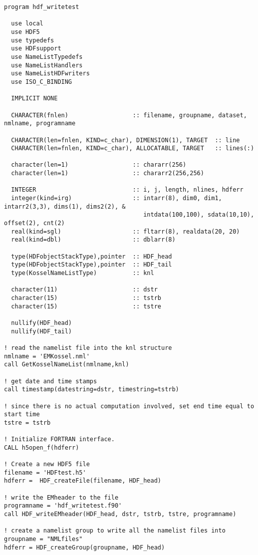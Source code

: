 \documentclass[DIV=calc, paper=letter, fontsize=11pt]{scrartcl}	 %
\begin{document}
{\small\begin{verbatim}
program hdf_writetest

  use local
  use HDF5
  use typedefs
  use HDFsupport
  use NameListTypedefs
  use NameListHandlers
  use NameListHDFwriters
  use ISO_C_BINDING
  
  IMPLICIT NONE

  CHARACTER(fnlen)                  :: filename, groupname, dataset, nmlname, programname
  
  CHARACTER(len=fnlen, KIND=c_char), DIMENSION(1), TARGET  :: line 
  CHARACTER(len=fnlen, KIND=c_char), ALLOCATABLE, TARGET   :: lines(:) 

  character(len=1)                  :: chararr(256)
  character(len=1)                  :: chararr2(256,256)

  INTEGER                           :: i, j, length, nlines, hdferr
  integer(kind=irg)                 :: intarr(8), dim0, dim1, intarr2(3,3), dims(1), dims2(2), &
                                       intdata(100,100), sdata(10,10), offset(2), cnt(2)
  real(kind=sgl)                    :: fltarr(8), realdata(20, 20)
  real(kind=dbl)                    :: dblarr(8)

  type(HDFobjectStackType),pointer  :: HDF_head
  type(HDFobjectStackType),pointer  :: HDF_tail
  type(KosselNameListType)          :: knl

  character(11)                     :: dstr
  character(15)                     :: tstrb
  character(15)                     :: tstre

  nullify(HDF_head)
  nullify(HDF_tail)

! read the namelist file into the knl structure
nmlname = 'EMKossel.nml'
call GetKosselNameList(nmlname,knl)

! get date and time stamps
call timestamp(datestring=dstr, timestring=tstrb)

! since there is no actual computation involved, set end time equal to start time
tstre = tstrb

! Initialize FORTRAN interface.
CALL h5open_f(hdferr)

! Create a new HDF5 file
filename = 'HDFtest.h5'
hdferr =  HDF_createFile(filename, HDF_head)

! write the EMheader to the file
programname = 'hdf_writetest.f90'
call HDF_writeEMheader(HDF_head, dstr, tstrb, tstre, programname)

! create a namelist group to write all the namelist files into
groupname = "NMLfiles"
hdferr = HDF_createGroup(groupname, HDF_head)


\end{verbatim}}
\end{document}
